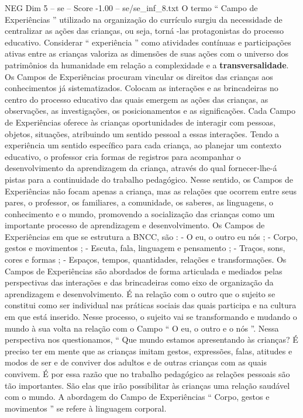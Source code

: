 \begin{textsample}{NEG Dim 5 – se – Score -1.00 – se/se\_inf\_8.txt}
O termo “ Campo de Experiências ” utilizado na organização do currículo surgiu da necessidade de centralizar as ações das crianças, ou seja, torná -las protagonistas do processo educativo.
Considerar “ experiência ” como atividades contínuas e participações ativas entre as crianças valoriza as dimensões de suas ações com o universo dos patrimônios da humanidade em relação a complexidade e a \textbf{transversalidade}.
Os Campos de Experiências procuram vincular os direitos das crianças aos conhecimentos já sistematizados.
Colocam as interações e as brincadeiras no centro do processo educativo das quais emergem as ações das crianças, as observações, as investigações, os posicionamentos e as significações.
Cada Campo de Experiências oferece às crianças oportunidades de interagir com pessoas, objetos, situações, atribuindo um sentido pessoal a essas interações.
Tendo a experiência um sentido específico para cada criança, ao planejar um contexto educativo, o professor cria formas de registros para acompanhar o desenvolvimento da aprendizagem da criança, através do qual fornecer-lhe-á pistas para a continuidade do trabalho pedagógico.
Nesse sentido, os Campos de Experiências não focam apenas a criança, mas as relações que ocorrem entre seus pares, o professor, os familiares, a comunidade, os saberes, as linguagens, o conhecimento e o mundo, promovendo a socialização das crianças como um importante processo de aprendizagem e desenvolvimento.
Os Campos de Experiências em que se estrutura a BNCC, são : - O eu, o outro eu nós ; - Corpo, gestos e movimentos ; - Escuta, fala, linguagem e pensamento ; - Traços, sons, cores e formas ; - Espaços, tempos, quantidades, relações e transformações.
Os Campos de Experiências são abordados de forma articulada e mediados pelas perspectivas das interações e das brincadeiras como eixo de organização da aprendizagem e desenvolvimento.
É na relação com o outro que o sujeito se constitui como ser individual nas práticas sociais das quais participa e na cultura em que está inserido.
Nesse processo, o sujeito vai se transformando e mudando o mundo à sua volta na relação com o Campo “ O eu, o outro e o nós ”.
Nessa perspectiva nos questionamos, “ Que mundo estamos apresentando às crianças?
É preciso ter em mente que as crianças imitam gestos, expressões, falas, atitudes e modos de ser e de conviver dos adultos e de outras crianças com as quais convivem.
É por essa razão que no trabalho pedagógico as relações pessoais são tão importantes.
São elas que irão possibilitar às crianças uma relação saudável com o mundo.
A abordagem do Campo de Experiências “ Corpo, gestos e movimentos ” se refere à linguagem corporal.

\end{textsample}
